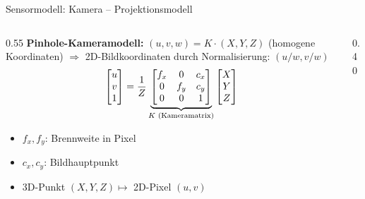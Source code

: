 \documentclass[%
  aspectratio=169,
  10pt
]{beamer}
\begin{document}
\begin{frame}{Sensormodell: Kamera -- Projektionsmodell}

\begin{columns}[T]
  \begin{column}{0.55\textwidth}
    \textbf{Pinhole-Kameramodell:}
    $(u, v, w) = K \cdot (X, Y, Z)$ (homogene Koordinaten) $\Rightarrow$ 2D-Bildkoordinaten durch Normalisierung: $(u/w, v/w)$
    \[
      \begin{bmatrix} u \\ v \\ 1 \end{bmatrix}
      = \frac{1}{Z}
      \underbrace{%
        \begin{bmatrix} f_x & 0 & c_x \\ 0 & f_y & c_y \\ 0 & 0 & 1 \end{bmatrix}
      }_{K \text{ (Kameramatrix)}}
      \begin{bmatrix} X \\ Y \\ Z \end{bmatrix}
    \]

    \begin{itemize}
      \item $f_x, f_y$: Brennweite in Pixel
      \item $c_x, c_y$: Bildhauptpunkt
      \item 3D-Punkt $(X,Y,Z) \mapsto$ 2D-Pixel $(u,v)$
    \end{itemize}
  \end{column}
  \begin{column}{0.40\textwidth}
  \end{column}
\end{columns}

\end{frame}
\end{document}
